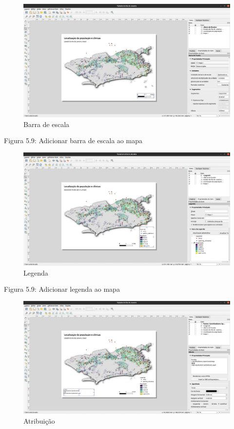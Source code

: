 \documentclass[
]{krantz}
\begin{document}
\begin{figure}
\centering
\includegraphics{media/modulo5/scale-bar.png}
\caption{Barra de escala}
\end{figure}

Figura 5.9: Adicionar barra de escala ao mapa

\begin{figure}
\centering
\includegraphics{media/modulo5/legend.png}
\caption{Legenda}
\end{figure}

Figura 5.9: Adicionar legenda ao mapa

\begin{figure}
\centering
\includegraphics{media/modulo5/attribution.png}
\caption{Atribuição}
\end{figure}
\end{document}
